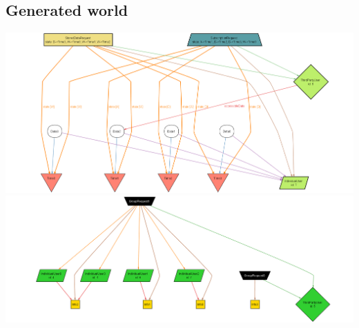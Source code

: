 \subsection{Generated world}
\includegraphics[width = 0.8\textheight, angle=90]{sections/alloy/GenWorldD4H.png}
\includegraphics[width = 0.8\textheight, angle=90]{sections/alloy/GenWorldD4H-2.png}
